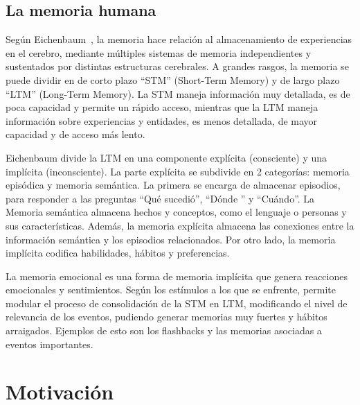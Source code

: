 \subsection{La memoria humana}

Según Eichenbaum~\cite{Eichenbaum:2008}, la memoria hace relación al almacenamiento de experiencias en el cerebro, mediante múltiples sistemas de memoria independientes y sustentados por distintas estructuras cerebrales. A grandes rasgos, la memoria se puede dividir en de corto plazo ``STM'' (Short-Term Memory) y de largo plazo ``LTM'' (Long-Term Memory). La STM maneja información muy detallada, es de poca capacidad y permite un rápido acceso, mientras que la LTM maneja información sobre experiencias y entidades, es menos detallada, de mayor capacidad y de acceso más lento.

Eichenbaum divide la LTM en una componente explícita (consciente) y una implícita (inconsciente). La parte explícita se subdivide en 2 categorías: memoria episódica y memoria semántica. La primera se encarga de almacenar episodios, para responder a las preguntas ``Qué sucedió'', ``Dónde '' y ``Cuándo''. La Memoria semántica almacena hechos y conceptos, como el lenguaje o personas y sus características. Además, la memoria explícita  almacena las conexiones entre la información semántica y los episodios relacionados. Por otro lado, la memoria implícita codifica habilidades, hábitos y preferencias.

La memoria emocional es una forma de memoria implícita que genera reacciones emocionales y sentimientos. Según los estímulos a los que se enfrente, permite modular el proceso de consolidación de la STM en LTM, modificando el nivel de relevancia de los eventos, pudiendo generar memorias muy fuertes y hábitos arraigados. Ejemplos de esto son los flashbacks y las memorias asociadas a eventos importantes.




\section{Motivación}

